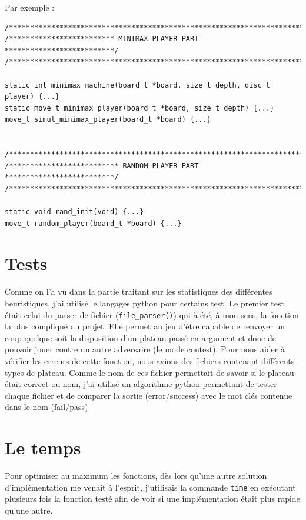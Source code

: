 \documentclass{report}
\begin{document}
Par exemple : \newline

\begin{lstlisting}
/************************************************************************/
/************************* MINIMAX PLAYER PART **************************/
/************************************************************************/

static int minimax_machine(board_t *board, size_t depth, disc_t player) {...}
static move_t minimax_player(board_t *board, size_t depth) {...}
move_t simul_minimax_player(board_t *board) {...}


/************************************************************************/
/************************** RANDOM PLAYER PART **************************/
/************************************************************************/

static void rand_init(void) {...}
move_t random_player(board_t *board) {...}
\end{lstlisting}

\section{Tests}
Comme on l'a vu dans la partie traitant sur les statistiques des différentes heuristiques, j'ai utilisé le langages python pour certains test. Le premier test était celui du parser de fichier (\texttt{file\_parser()}) qui à été, à mon sens, la fonction la plus compliqué du projet. Elle permet au jeu d'être capable de renvoyer un coup quelque soit la disposition d'un plateau passé en argument et donc de pouvoir jouer contre un autre adversaire (le mode contest). Pour nous aider à vérifier les erreurs de cette fonction, nous avions des fichiers contenant différents types de plateau. Comme le nom de ces fichier permettait de savoir si le plateau était correct ou nom, j'ai utilisé un algorithme python permettant de tester chaque fichier et de comparer la sortie (error/success) avec le mot clés contenue dans le nom (fail/pass)

\section{Le temps}
Pour optimiser au maximum les fonctions, dès lors qu'une autre solution d'implémentation me venait à l'esprit, j'utilisais la commande \texttt{time} en exécutant plusieurs fois la fonction testé afin de voir si une implémentation était plus rapide qu'une autre.
\end{document}
